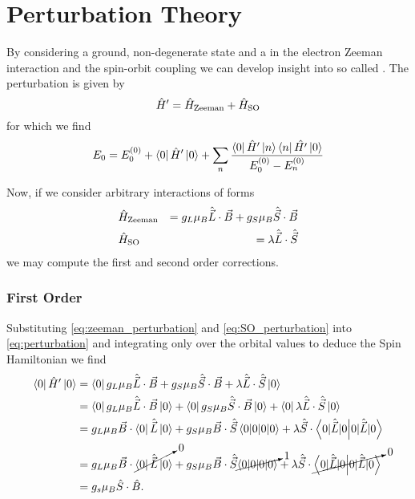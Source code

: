 \section{Perturbation Theory}
By considering a ground, non-degenerate state and a  in the electron Zeeman interaction and the spin-orbit coupling we can develop insight into so called . The perturbation is given by 
\begin{equation}
    \hat{H}' = \hat{H}_{\ce{Zeeman}} + \hat{H}_{\ce{SO}}  
\end{equation}
for which we find 
\begin{equation}
    E_0 = E^{(0)}_0 + \bra{0}{\hat{H}'}\ket{0}  + \sum_{n}\frac{\bra{0} \hat{H}' \ket{n} \bra{n} \hat{H'}\ket{0}}{E_0^{(0)} - E_n^{(0)}}
    \label{eq:perturbation}
\end{equation}

Now, if we consider arbitrary interactions of forms
\begin{eqnarray}
    &\hat{H}_{\ce{Zeeman}} &= g_L \mu_B \hat{\vec{L}}\cdot\vec{B} + g_S \mu_B \hat{\vec{S}}\cdot\vec{B} \label{eq:zeeman_perturbation}\\ 
    & \hat{H}_{\ce{SO}} &= \lambda\hat{\vec{L}}\cdot \hat{\vec{S}} \label{eq:SO_perturbation}
\end{eqnarray}
we may compute the first and second order corrections. 


\subsubsection{First Order}
Substituting \eqref{eq:zeeman_perturbation} and \eqref{eq:SO_perturbation} into \eqref{eq:perturbation} and integrating only over the orbital values to deduce the Spin Hamiltonian we find
\begin{equation}
   \begin{align}
       \bra{0} \hat{H}' \ket{0} &= \bra{0} g_L \mu_B \hat{\vec{L}}\cdot \vec{B} + g_S \mu_B \hat{\vec{S}}\cdot \vec{B} + \lambda\hat{\vec{L}} \cdot \hat{\vec{S}} \ket{0}\\ 
                                & = \bra{0} g_L\mu_B \hat{\vec{L}} \cdot \vec{B} \ket{0} + \bra{0}g_S \mu_B \hat{\vec{S}}\cdot \vec{B}\ket{0} + \bra{0}\lambda\hat{\vec{L}} \cdot \hat{\vec{S}} \ket{0}\\
                                &= g_L\mu_B \vec{B} \cdot \bra{0}\hat{\vec{L}}\ket{0} + g_S \mu_B  \vec{B} \cdot \hat{\vec{S}}\braket{0|0} + \lambda \hat{\vec{S}} \cdot \braket{0|\hat{\vec{L}}|0}\\ 
                                &= g_L\mu_B \vec{B} \cdot \cancelto{0}{\bra{0}\hat{\vec{L}}\ket{0}} + g_S \mu_B  \vec{B} \cdot \hat{\vec{S}}\cancelto{1}{\braket{0|0}} + \lambda \hat{\vec{S}} \cdot \cancelto{0}{\braket{0|\hat{\vec{L}}|0}}\\ 
                                &= g_s \mu_B \hat{S}\cdot\hat{B}.
   \end{align} 
    \label{eq:first_order}
\end{equation}

